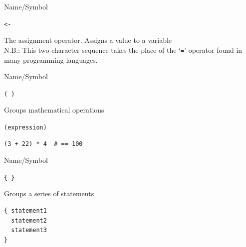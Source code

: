      
\begin{desc}{Name/Symbol}

\item[Name/Symbol] \verb!<-!                  

\item[Description]  The assignment operator.  Assigns a value to a variable\\
              N.B.: This two-character sequence takes the place of the
	      `\verb!=!' operator found in many programming languages.

\item[Usage]       

\item[Example]     

\item[See Also]  

\end{desc}   



\begin{desc}{Name/Symbol}

\item[Name/Symbol] \verb+( )+                  

\item[Description] Groups mathematical operations

\item[Usage]      \verb+(expression)+

\item[Example]
\begin{verbatim}
(3 + 22) * 4  # == 100
\end{verbatim}

\item[See Also]     

\end{desc}



\begin{desc}{Name/Symbol}

\item[Name/Symbol] \verb!{ }!                  

\item[Description] Groups a series of statements

\item[Usage]
\begin{verbatim}
{ statement1
  statement2
  statement3
}
\end{verbatim}
	     

\item[Example]     

\item[See Also]     
\end{desc}



